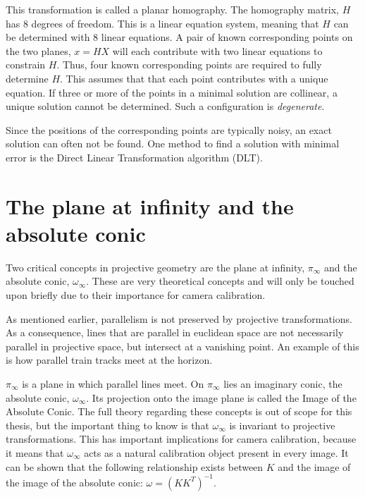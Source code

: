 This transformation is called a planar homography. The homography matrix, $H$ has 8 degrees of freedom. 
This is a linear equation system, meaning that $H$ can be determined with 8 linear equations.
A pair of known corresponding points on the two planes, $x=HX$ will each contribute with two linear equations to constrain $H$.
Thus, four known corresponding points are required to fully determine $H$.
This assumes that that each point contributes with a unique equation.
If three or more of the points in a minimal solution are collinear, a unique solution cannot be determined.
Such a configuration is \textit{degenerate}. \cite[91-92]{hartley-zisserman}

Since the positions of the corresponding points are typically noisy, an exact solution can often not be found.
One method to find a solution with minimal error is the Direct Linear Transformation algorithm (DLT). \cite{homography-estimation}

\section{The plane at infinity and the absolute conic} \label{ac}
Two critical concepts in projective geometry are the plane at infinity, $\pi_{\infty}$ and the absolute conic, $\omega_{\infty}$.
These are very theoretical concepts and will only be touched upon briefly due to their importance for camera calibration.

As mentioned earlier, parallelism is not preserved by projective transformations. 
As a consequence, lines that are parallel in euclidean space are not necessarily parallel in projective space, but intersect at a vanishing point.
An example of this is how parallel train tracks meet at the horizon.

$\pi_{\infty}$ is a plane in which parallel lines meet. 
On $\pi_{\infty}$ lies an imaginary conic, the absolute conic, $\omega_{\infty}$.
Its projection onto the image plane is called the Image of the Absolute Conic.
The full theory regarding these concepts is out of scope for this thesis, but the important thing to know is that $\omega_{\infty}$ is invariant to projective transformations.
This has important implications for camera calibration, because it means that $\omega_{\infty}$ acts as a natural calibration object present in every image.
It can be shown that the following relationship exists between $K$ and the image of the image of the absolute conic:
$\omega = (KK^T)^{-1}$. \cite[210]{hartley-zisserman}\cite{pollefeys}

